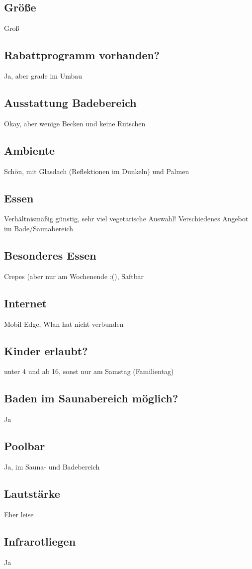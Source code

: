 \documentclass{article}
\begin{document}
\subsection*{Größe} Groß
\subsection*{Rabattprogramm vorhanden?} Ja, aber grade im Umbau 
\subsection*{Ausstattung Badebereich} Okay, aber wenige Becken und keine Rutschen
\subsection*{Ambiente} Schön, mit Glasdach (Reflektionen im Dunkeln) und Palmen
\subsection*{Essen} Verhältnismäßig günstig, sehr viel vegetarische Auswahl! Verschiedenes Angebot im Bade/Saunabereich
\subsection*{Besonderes Essen} Crepes (aber nur am Wochenende :(), Saftbar
\subsection*{Internet} Mobil Edge, Wlan hat nicht verbunden
\subsection*{Kinder erlaubt?} unter 4 und ab 16, sonst nur am Samstag (Familientag)
\subsection*{Baden im Saunabereich möglich?} Ja
\subsection*{Poolbar} Ja, im Sauna- und Badebereich
\subsection*{Lautstärke} Eher leise
\subsection*{Infrarotliegen} Ja
\end{document}
